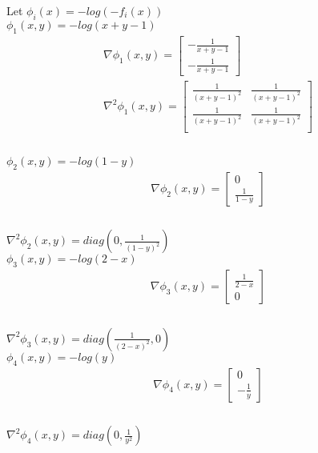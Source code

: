 \documentclass[fleqn]{article}
\begin{document}
Let $\phi_i(x)=-log(-f_i(x))$ \\

$\phi_1(x,y) = -log(x+y-1) $ \\
\begin{multline*}
\nabla \phi_1(x,y) =
\begin{bmatrix}
	-\frac{1}{x+y-1}  \\ -\frac{1}{x+y-1}
\end{bmatrix} \\
\nabla^2 \phi_1(x,y) =
\begin{bmatrix} 
    \frac{1}{(x+y-1)^2} & \frac{1}{(x+y-1)^2}
 \\
	\frac{1}{(x+y-1)^2} & \frac{1}{(x+y-1)^2}
 \\
\end{bmatrix} \\
\end{multline*} \\

$\phi_2(x,y) = -log(1-y) $ \\
\begin{multline*}
\nabla \phi_2(x,y) =
\begin{bmatrix}	0   \\ \frac{1}{1-y} \end{bmatrix} \\
\end{multline*} \\
$\nabla^2 \phi_2(x,y) =diag(0, \frac{1}{(1-y)^2} )$ \\

$\phi_3(x,y) = -log(2-x) $ \\
\begin{multline*}
\nabla \phi_3(x,y) =
\begin{bmatrix}	\frac{1}{2-x}   \\ 0 \end{bmatrix} \\
\end{multline*} \\
$\nabla^2 \phi_3(x,y) =diag(\frac{1}{(2-x)^2}, 0)$ \\

$\phi_4(x,y) = -log(y) $ \\
\begin{multline*}
\nabla \phi_4(x,y) =
\begin{bmatrix}	0 \\ -\frac{1}{y} \end{bmatrix} \\
\end{multline*} \\
$\nabla^2 \phi_4(x,y) =diag(0, \frac{1}{y^2})$ \\
\end{document}
